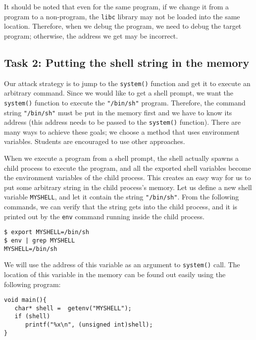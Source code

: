 It should be noted that even for the same program, if we change it from a \setuid
program to a non-\setuid program, the \texttt{libc} library may not be loaded
into the same location. Therefore, when we debug the program, we need
to debug the target \setuid program; otherwise, the address we
get may be incorrect.




\subsection{Task 2: Putting the shell string in the memory}

Our attack strategy is to jump to the \texttt{system()} function and 
get it to execute an arbitrary command. Since we would like to 
get a shell prompt, we want the \texttt{system()} function
to execute the \texttt{"/bin/sh"} program. Therefore, the 
command string \texttt{"/bin/sh"} must be put in the memory first and 
we have to know its address (this address needs to be passed to 
the \texttt{system()} function). There are many ways to
achieve these goals; we choose a method that uses environment variables.
Students are encouraged to use other approaches. 


When we execute a program from a shell prompt, the shell actually 
spawns a child process to execute the program, and all 
the exported shell variables become the environment variables 
of the child process. This creates an easy way for us to 
put some arbitrary string in the child process's memory. 
Let us define a new shell variable \texttt{MYSHELL}, and let it
contain the string \texttt{"/bin/sh"}. From the following commands,
we can verify that the string gets into the child process, and it is 
printed out by the \texttt{env} command running inside the child process.

\begin{lstlisting}
$ export MYSHELL=/bin/sh
$ env | grep MYSHELL
MYSHELL=/bin/sh
\end{lstlisting}

We will use the address of this variable as an argument to {\tt system()} call.
The location of this variable in the memory can be found out easily using the 
following program: 

\begin{lstlisting}
void main(){
   char* shell =  getenv("MYSHELL");
   if (shell) 
      printf("%x\n", (unsigned int)shell);
}
\end{lstlisting}


